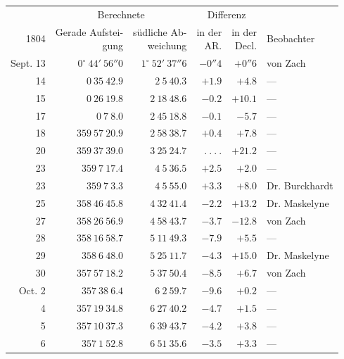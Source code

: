 \begin{center}
\begingroup\fontsize{8}{10}\selectfont\setlength{\tabcolsep}{3pt}\renewcommand{\arraystretch}{1.1}
\begin{tabular}{r|r|r|r|r|l}
 & \multicolumn{2}{c|}{Berechnete} & \multicolumn{2}{c|}{Differenz} & \\ 1804 & \shortstack{Gerade Aufstei-\\gung} & \shortstack{südliche Ab-\\weichung} & \shortstack{in der\\AR.} & \shortstack{in der\\Decl.} & Beobachter \\ \hline
Sept. 13 & $0^\circ\ 44'\ 56''0$ & $1^\circ\ 52'\ 37''6$ & $-0''4$ & $+0''6$ & von Zach \\
14 & $0\ 35\ 42.9$ & $2\ 5\ 40.3$ & $+1.9$ & $+4.8$ & — \\
15 & $0\ 26\ 19.8$ & $2\ 18\ 48.6$ & $-0.2$ & $+10.1$ & — \\
17 & $0\ 7\ 8.0$ & $2\ 45\ 18.8$ & $-0.1$ & $-5.7$ & — \\
18 & $359\ 57\ 20.9$ & $2\ 58\ 38.7$ & $+0.4$ & $+7.8$ & — \\
20 & $359\ 37\ 39.0$ & $3\ 25\ 24.7$ & $.\ .\ .\ .$ & $+21.2$ & — \\
23 & $359\ 7\ 17.4$ & $4\ 5\ 36.5$ & $+2.5$ & $+2.0$ & — \\
23 & $359\ 7\ 3.3$ & $4\ 5\ 55.0$ & $+3.3$ & $+8.0$ & Dr. Burckhardt \\
25 & $358\ 46\ 45.8$ & $4\ 32\ 41.4$ & $-2.2$ & $+13.2$ & Dr. Maskelyne \\
27 & $358\ 26\ 56.9$ & $4\ 58\ 43.7$ & $-3.7$ & $-12.8$ & von Zach \\
28 & $358\ 16\ 58.7$ & $5\ 11\ 49.3$ & $-7.9$ & $+5.5$ & — \\
29 & $358\ 6\ 48.0$ & $5\ 25\ 11.7$ & $-4.3$ & $+15.0$ & Dr. Maskelyne \\
30 & $357\ 57\ 18.2$ & $5\ 37\ 50.4$ & $-8.5$ & $+6.7$ & von Zach \\
Oct. 2 & $357\ 38\ 6.4$ & $6\ 2\ 59.7$ & $-9.6$ & $+0.2$ & — \\
4 & $357\ 19\ 34.8$ & $6\ 27\ 40.2$ & $-4.7$ & $+1.5$ & — \\
5 & $357\ 10\ 37.3$ & $6\ 39\ 43.7$ & $-4.2$ & $+3.8$ & — \\
6 & $357\ 1\ 52.8$ & $6\ 51\ 35.6$ & $-3.5$ & $+3.3$ & — \\
\end{tabular}\endgroup
\end{center}

